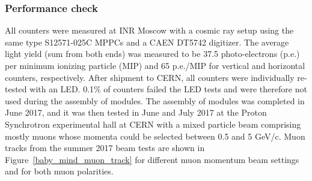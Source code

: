 \subsubsection{Performance check}
All counters were measured at INR Moscow with a cosmic ray setup using the same type S12571-025C MPPCs and a CAEN DT5742 digitizer.%
The average light yield (sum from both ends) was measured to be 37.5 photo-electrons (p.e.) per minimum ionizing particle (MIP) and 65 p.e./MIP for vertical and horizontal counters, respectively. 
After shipment to CERN, all counters were individually re-tested with an LED.
0.1\% of counters failed the LED tests and were therefore not used during the assembly of modules. 
The assembly of modules was completed in June 2017, and it was then tested in June and July 2017 at the Proton Synchrotron experimental hall at CERN with a mixed particle beam comprising mostly muons whose momenta could be selected between 0.5 and 5 GeV/c. 
Muon tracks from the summer 2017 beam tests are shown in Figure~\ref{baby_mind_muon_track} for different muon momentum beam settings and for both muon polarities.
